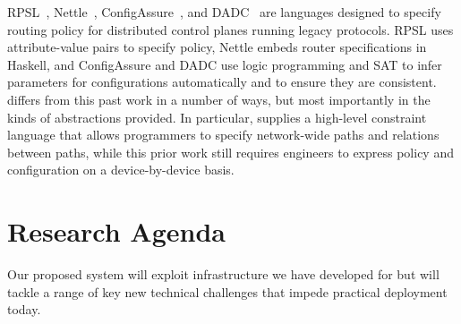 RPSL~\cite{rpsl}, Nettle~\cite{nettle}, ConfigAssure~\cite{narain:lisa05,narain+:configassure}, and DADC~\cite{DADC} are languages designed to specify routing policy for distributed control planes
running legacy protocols.  RPSL uses attribute-value pairs to specify policy,
Nettle embeds router specifications in Haskell, and
ConfigAssure and DADC use logic programming
and SAT to infer parameters for configurations automatically and to ensure they
are consistent.  \Propane differs from this past work in a number of ways, but most
importantly in the kinds of abstractions provided.  In particular, \Propane supplies
a high-level constraint language that allows programmers to specify
network-wide paths and relations between paths, while this prior work 
still requires engineers to express policy and configuration on a device-by-device basis.




\section{Research Agenda}
\label{sec:research}

Our proposed \Name system will exploit infrastructure we have developed for \Propane
but will tackle a range of key new technical challenges that impede practical deployment today.

